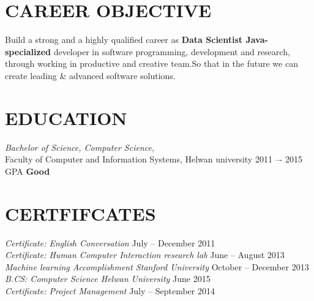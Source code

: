 \documentclass[10pt]{res} %
\begin{document}
\begin{resume}


\section{\large \color{blue}CAREER OBJECTIVE}

\vspace{5pt} %

Build a strong and a highly qualified career as \textbf{ Data Scientist Java-specialized } developer in software programming, development and research, through working in productive and creative team.So that in the future we can create leading \& advanced software solutions. 

\section{\large \color{blue}EDUCATION} 

\vspace{5pt} %

{\sl Bachelor of Science, Computer Science}, \\
Faculty of Computer and Information Systems, Helwan university \hfill 2011 –- 2015 \\ 
GPA \bf Good
 

\section{\large \color{blue}CERTFIFCATES} 

\vspace{5pt} %

{\sl Certificate: English Conversation} \hfill July -- December 2011 \\
{\sl Certificate: Human Computer Interaction research lab } \hfill June -- August 2013 \\
{\sl Machine learning Accomplishment Stanford University } \hfill October -- December 2013 \\
{\sl B.CS: Computer Science Helwan University } \hfill June 2015 \\
{\sl Certificate: Project Management } \hfill July -- September 2014


\vspace{0.2in} %


\end{resume}
\end{document}

